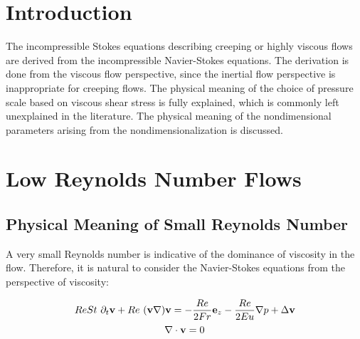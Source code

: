 
\providecommand{\divergenceNondim}{\nabla^{\prime}\cdot}

\providecommand{\velocityNondim}{\mathbf{v^{\prime}}}

\providecommand{\substDerivVelNondim}{\frac{D\velocity^{\prime}}{dt^{\prime}}}
\providecommand{\partialTimeVelNondim}{\partial_{t^{\prime}}\velocity^{\prime}}
\providecommand{\inertTermVelNondim}{(\velocity^{\prime}\nabla^{\prime})\velocity^{\prime}}

\providecommand{\velocityPressureTensorNondim}{\partial_k^{\prime}v^{l \prime}\partial_k^{\prime}v^{l \prime}}

\providecommand{\pressGradNondim}{\nabla^{\prime} p^{\prime}}
\providecommand{\pressLaplacianNondim}{\Delta^{\prime} p^{\prime}}
\providecommand{\laplacianVelNondim}{\Delta^{\prime}\velocity^{\prime}}

\section{Introduction}
 
The incompressible Stokes equations describing creeping or highly viscous flows are derived from the incompressible Navier-Stokes equations. The derivation is done from the viscous flow perspective, since the inertial flow perspective is inappropriate for creeping flows. The physical meaning of the choice of pressure scale based on viscous shear stress is fully explained, which is commonly left unexplained in the literature. The physical meaning of the nondimensional parameters arising from the nondimensionalization is discussed.

\section{Low Reynolds Number Flows}

\subsection{Physical Meaning of Small Reynolds Number}

A very small Reynolds number is indicative of the dominance of viscosity in the flow. Therefore, it is natural to consider the Navier-Stokes equations from the perspective of viscosity:

\begin{equation} \label{NS1-viscNondim}
Re St~ \partial_t\mathbf{v} + Re ~(\mathbf{v}\nabla)\mathbf{v} = -\frac{Re}{2Fr} \mathbf{e}_z - \frac{Re}{2 Eu}\nabla p + \Delta\mathbf{v} 
\end{equation}
\begin{equation} \label{NS2-viscNondim}
\nabla\cdot\mathbf{v} = 0 
\end{equation}

